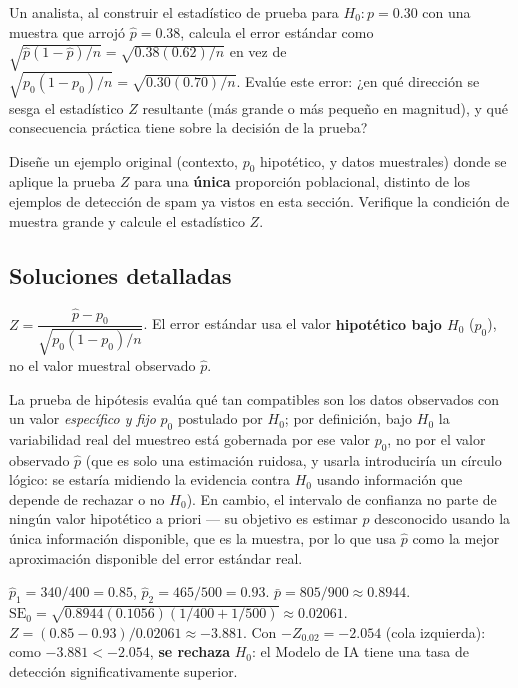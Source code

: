 \begin{problema}
	\label{prob:f016371}
	Un analista, al construir el estadístico de prueba para $H_0:p=0.30$ con una muestra que arrojó $\hat p=0.38$, calcula el error estándar como $\sqrt{\hat p(1-\hat p)/n} = \sqrt{0.38(0.62)/n}$ en vez de $\sqrt{p_0(1-p_0)/n}=\sqrt{0.30(0.70)/n}$. Evalúe este error: ¿en qué dirección se sesga el estadístico $Z$ resultante (más grande o más pequeño en magnitud), y qué consecuencia práctica tiene sobre la decisión de la prueba?
\end{problema}

\begin{problema}
	\label{prob:134cb53}
	Diseñe un ejemplo original (contexto, $p_0$ hipotético, y datos muestrales) donde se aplique la prueba $Z$ para una \textbf{única} proporción poblacional, distinto de los ejemplos de detección de spam ya vistos en esta sección. Verifique la condición de muestra grande y calcule el estadístico $Z$.
\end{problema}

\subsection*{Soluciones detalladas}

\begin{solproblema}[prob:9667d45]
	$Z = \dfrac{\hat p-p_0}{\sqrt{p_0(1-p_0)/n}}$. El error estándar usa el valor \textbf{hipotético bajo $H_0$} ($p_0$), no el valor muestral observado $\hat p$.
\end{solproblema}

\begin{solproblema}
	La prueba de hipótesis evalúa qué tan compatibles son los datos observados con un valor \emph{específico y fijo} $p_0$ postulado por $H_0$; por definición, bajo $H_0$ la variabilidad real del muestreo está gobernada por ese valor $p_0$, no por el valor observado $\hat p$ (que es solo una estimación ruidosa, y usarla introduciría un círculo lógico: se estaría midiendo la evidencia contra $H_0$ usando información que depende de rechazar o no $H_0$). En cambio, el intervalo de confianza no parte de ningún valor hipotético a priori — su objetivo es estimar $p$ desconocido usando la única información disponible, que es la muestra, por lo que usa $\hat p$ como la mejor aproximación disponible del error estándar real.
\end{solproblema}

\begin{solproblema}[prob:7649a34]
	$\hat p_1=340/400=0.85$, $\hat p_2=465/500=0.93$. $\bar p = 805/900\approx0.8944$. $\text{SE}_0 = \sqrt{0.8944(0.1056)(1/400+1/500)}\approx0.02061$. $Z = (0.85-0.93)/0.02061\approx-3.881$. Con $-Z_{0.02}=-2.054$ (cola izquierda): como $-3.881<-2.054$, \textbf{se rechaza} $H_0$: el Modelo de IA tiene una tasa de detección significativamente superior.
\end{solproblema}

